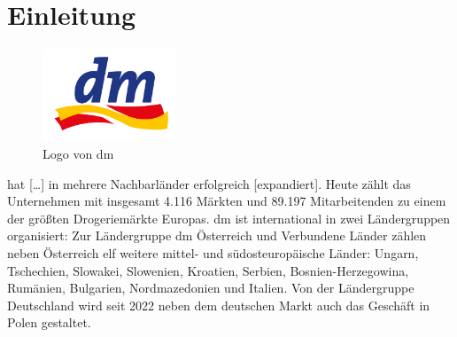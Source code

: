 \chapter{Einleitung}
        \begin{figure}[ht]
            \centering
            \includegraphics[width=4cm]{dependencies/pictures/dm_Logo.png}
            \caption[\ac{dm} Logo]{Logo von \ac{dm}\autocite{Logo.dm}}
            \label{fig:dmLogo}
        \end{figure}
        
        \glqq [\ac{dm}] [\dots] hat [\dots] in mehrere Nachbarländer erfolgreich [expandiert].
        Heute zählt das Unternehmen mit insgesamt 4.116 Märkten und 89.197 Mitarbeitenden zu einem der größten Drogeriemärkte Europas.
        \ac{dm} ist international in zwei Ländergruppen organisiert: Zur Ländergruppe dm Österreich und Verbundene Länder zählen neben Österreich elf weitere mittel- und südosteuropäische Länder: Ungarn, Tschechien, Slowakei, Slowenien, Kroatien, Serbien, Bosnien-Herzegowina, Rumänien, Bulgarien, Nordmazedonien und Italien.
        Von der Ländergruppe Deutschland wird seit 2022 neben dem deutschen Markt auch das Geschäft in Polen gestaltet.\grqq{} \autocite{dm.Europa}
